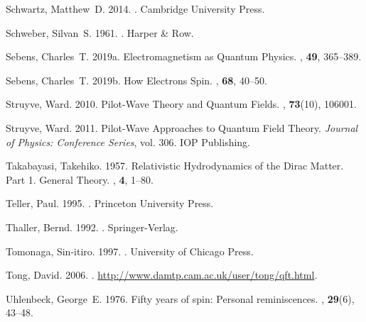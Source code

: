 \documentclass[onecolumn,secnumarabic,amsmath,amssymb,balancelastpage,nofootinbib]{article}
\begin{document}
\begin{thebibliography}{}
Schwartz, Matthew~D. 2014.
.
\newblock Cambridge University Press.

Schweber, Silvan~S. 1961.
.
\newblock Harper \& Row.

Sebens, Charles~T. 2019a.
\newblock Electromagnetism as Quantum Physics.
, {\bf 49}, 365--389.

Sebens, Charles~T. 2019b.
\newblock How Electrons Spin.
, {\bf 68}, 40--50.

Struyve, Ward. 2010.
\newblock Pilot-Wave Theory and Quantum Fields.
, {\bf 73}(10), 106001.

Struyve, Ward. 2011.
\newblock Pilot-Wave Approaches to Quantum Field Theory.
 {\em Journal of Physics: Conference Series},
  vol. 306.
\newblock IOP Publishing.

Takabayasi, Takehiko. 1957.
\newblock Relativistic Hydrodynamics of the Dirac Matter. Part 1. General
  Theory.
, {\bf 4}, 1--80.

Teller, Paul. 1995.
.
\newblock Princeton University Press.

Thaller, Bernd. 1992.
.
\newblock Springer-Verlag.

Tomonaga, Sin-itiro. 1997.
.
\newblock University of Chicago Press.

Tong, David. 2006.
.
\newblock \url{http://www.damtp.cam.ac.uk/user/tong/qft.html}.

Uhlenbeck, George~E. 1976.
\newblock Fifty years of spin: Personal reminiscences.
, {\bf 29}(6), 43--48.


\end{thebibliography}
\end{document}
